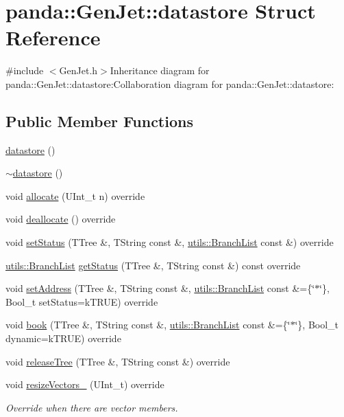 \hypertarget{structpanda_1_1GenJet_1_1datastore}{
\section{panda::GenJet::datastore Struct Reference}
\label{structpanda_1_1GenJet_1_1datastore}
}


{\ttfamily \#include $<$GenJet.h$>$}Inheritance diagram for panda::GenJet::datastore:Collaboration diagram for panda::GenJet::datastore:\subsection*{Public Member Functions}
\begin{DoxyCompactItemize}
\item 
\hyperlink{structpanda_1_1GenJet_1_1datastore_ad0ca5d1b0381eb65489787ba810fa69a}{datastore} ()
\item 
\hyperlink{structpanda_1_1GenJet_1_1datastore_aee5add4c9f162350865cec47c322dec0}{$\sim$datastore} ()
\item 
void \hyperlink{structpanda_1_1GenJet_1_1datastore_a8b05278d242cae6efa7c1cc2ed929d6a}{allocate} (UInt\_\-t n) override
\item 
void \hyperlink{structpanda_1_1GenJet_1_1datastore_a2b1e39eb4f994f496aa013aaf82998c4}{deallocate} () override
\item 
void \hyperlink{structpanda_1_1GenJet_1_1datastore_a7b9f67fdc168e7a372a9430c2b9866e3}{setStatus} (TTree \&, TString const \&, \hyperlink{classpanda_1_1utils_1_1BranchList}{utils::BranchList} const \&) override
\item 
\hyperlink{classpanda_1_1utils_1_1BranchList}{utils::BranchList} \hyperlink{structpanda_1_1GenJet_1_1datastore_a38a95477762b562ae4a6f2487e2c26ff}{getStatus} (TTree \&, TString const \&) const override
\item 
void \hyperlink{structpanda_1_1GenJet_1_1datastore_a7afa28bd4468d7ecb3c4c086d46ee6cf}{setAddress} (TTree \&, TString const \&, \hyperlink{classpanda_1_1utils_1_1BranchList}{utils::BranchList} const \&=\{\char`\"{}$\ast$\char`\"{}\}, Bool\_\-t setStatus=kTRUE) override
\item 
void \hyperlink{structpanda_1_1GenJet_1_1datastore_abfe95213671131d88149b11bbe4a0f45}{book} (TTree \&, TString const \&, \hyperlink{classpanda_1_1utils_1_1BranchList}{utils::BranchList} const \&=\{\char`\"{}$\ast$\char`\"{}\}, Bool\_\-t dynamic=kTRUE) override
\item 
void \hyperlink{structpanda_1_1GenJet_1_1datastore_aea7b516e513fbdf5cc2c6f67d0ae3dba}{releaseTree} (TTree \&, TString const \&) override
\item 
void \hyperlink{structpanda_1_1GenJet_1_1datastore_a6b6d0feb6fe978115c45180cccb7497b}{resizeVectors\_\-} (UInt\_\-t) override
\begin{DoxyCompactList}\small\item\em Override when there are vector members. \item\end{DoxyCompactList}\end{DoxyCompactItemize}


